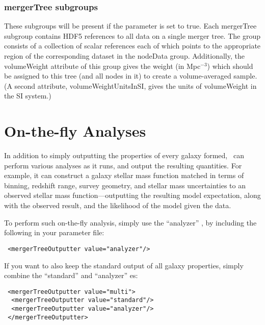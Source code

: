\subsubsection{mergerTree subgroups}\label{sec:mergerTreeSubgroups}

These subgroups will be present if the {\normalfont \ttfamily [mergerTreeOutputReferences]} parameter is set to true. Each {\normalfont \ttfamily mergerTree} subgroup contains HDF5 references to all data on a single merger tree. The group consists of a collection of scalar references each of which points to the appropriate region of the corresponding dataset in the {\normalfont \ttfamily nodeData} group. Additionally, the {\normalfont \ttfamily volumeWeight} attribute of this group gives the weight (in Mpc$^{-3}$) which should be assigned to this tree (and all nodes in it) to create a volume-averaged sample. (A second attribute, {\normalfont \ttfamily volumeWeightUnitsInSI}, gives the units of {\normalfont \ttfamily volumeWeight} in the SI system.)

\section{On-the-fly Analyses}\label{sec:onTheFlyAnalyses}

In addition to simply outputting the properties of every galaxy formed, \glc\ can perform various analyses as it runs, and output the resulting quantities. For example, it can construct a galaxy stellar mass function matched in terms of binning, redshift range, survey geometry, and stellar mass uncertainties to an observed stellar mass function---outputting the resulting model expectation, along with the observed result, and the likelihood of the model given the data. 

To perform such on-the-fly analysis, simply use the ``{\normalfont \ttfamily analyzer}'' , by including the following in your parameter file:
\begin{verbatim}
 <mergerTreeOutputter value="analyzer"/>
\end{verbatim}
If you want to also keep the standard output of all galaxy properties, simply combine the ``{\normalfont \ttfamily standard}'' and ``{\normalfont \ttfamily analyzer}'' es:
\begin{verbatim}
 <mergerTreeOutputter value="multi">
  <mergerTreeOutputter value="standard"/>
  <mergerTreeOutputter value="analyzer"/>
 </mergerTreeOutputter>
\end{verbatim}

